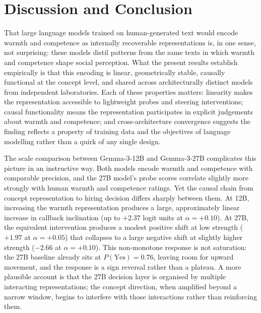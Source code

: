 \documentclass[twocolumn]{article}
\begin{document}
\section*{Discussion and Conclusion}

That large language models trained on human-generated text would encode
warmth and competence as internally recoverable representations is,
in one sense, not surprising: these models distil patterns from the
same texts in which warmth and competence shape social perception.
What the present results establish empirically is that this encoding is
linear, geometrically stable, causally functional at the concept level,
and shared across architecturally distinct models from independent
laboratories.
Each of these properties matters: linearity makes the representation
accessible to lightweight probes and steering interventions; causal
functionality means the representation participates in explicit
judgements about warmth and competence; and cross-architecture
convergence suggests the finding reflects a property of training data
and the objectives of language modelling rather than a quirk of any
single design.

The scale comparison between Gemma-3-12B and Gemma-3-27B complicates
this picture in an instructive way.
Both models encode warmth and competence with comparable precision, and
the 27B model's probe scores correlate slightly more strongly with human
warmth and competence ratings.
Yet the causal chain from concept representation to hiring decision differs
sharply between them.
At 12B, increasing the warmth representation produces a large, approximately
linear increase in callback inclination (up to $+2.37$ logit units at
$\alpha = +0.10$).
At 27B, the equivalent intervention produces a modest positive shift at low
strength ($+1.97$ at $\alpha = +0.05$) that collapses to a large negative
shift at slightly higher strength ($-2.66$ at $\alpha = +0.10$).
This non-monotone response is not saturation: the 27B baseline already
sits at $P(\text{Yes}) = 0.76$, leaving room for upward movement, and
the response is a sign reversal rather than a plateau.
A more plausible account is that the 27B decision layer is organised by
multiple interacting representations; the concept direction, when
amplified beyond a narrow window, begins to interfere with those
interactions rather than reinforcing them.
\end{document}
